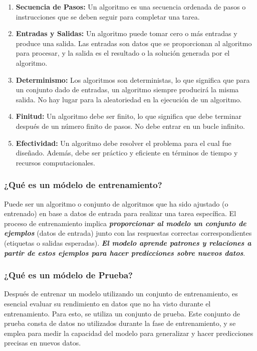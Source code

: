 \documentclass[
]{article}
\begin{document}
\begin{enumerate}
\def\labelenumi{\arabic{enumi}.}
\item
  \textbf{Secuencia de Pasos:} Un algoritmo es una secuencia ordenada de
  pasos o instrucciones que se deben seguir para completar una tarea.
\item
  \textbf{Entradas y Salidas:} Un algoritmo puede tomar cero o más
  entradas y produce una salida. Las entradas son datos que se
  proporcionan al algoritmo para procesar, y la salida es el resultado o
  la solución generada por el algoritmo.
\item
  \textbf{Determinismo:} Los algoritmos son deterministas, lo que
  significa que para un conjunto dado de entradas, un algoritmo siempre
  producirá la misma salida. No hay lugar para la aleatoriedad en la
  ejecución de un algoritmo.
\item
  \textbf{Finitud:} Un algoritmo debe ser finito, lo que significa que
  debe terminar después de un número finito de pasos. No debe entrar en
  un bucle infinito.
\item
  \textbf{Efectividad:} Un algoritmo debe resolver el problema para el
  cual fue diseñado. Además, debe ser práctico y eficiente en términos
  de tiempo y recursos computacionales.
\end{enumerate}

\hypertarget{quuxe9-es-un-muxf3delo-de-entrenamiento}{%
\subsubsection{¿Qué es un módelo de
entrenamiento?}\label{quuxe9-es-un-muxf3delo-de-entrenamiento}}

Puede ser un algoritmo o conjunto de algoritmos que ha sido ajustado (o
entrenado) en base a datos de entrada para realizar una tarea
específica. El proceso de entrenamiento implica
\textbf{\emph{proporcionar al modelo un conjunto de ejemplos}} (datos de
entrada) junto con las respuestas correctas correspondientes (etiquetas
o salidas esperadas). \textbf{\emph{El modelo aprende patrones y
relaciones a partir de estos ejemplos para hacer predicciones sobre
nuevos datos}}.

\hypertarget{quuxe9-es-un-muxf3delo-de-prueba}{%
\subsubsection{¿Qué es un módelo de
Prueba?}\label{quuxe9-es-un-muxf3delo-de-prueba}}

Después de entrenar un modelo utilizando un conjunto de entrenamiento,
es esencial evaluar su rendimiento en datos que no ha visto durante el
entrenamiento. Para esto, se utiliza un conjunto de prueba. Este
conjunto de prueba consta de datos no utilizados durante la fase de
entrenamiento, y se emplea para medir la capacidad del modelo para
generalizar y hacer predicciones precisas en nuevos datos.
\end{document}
